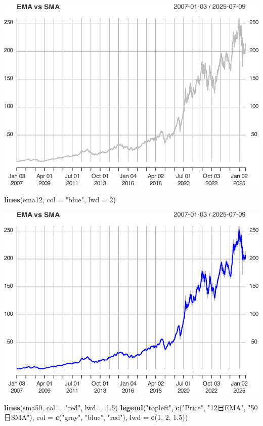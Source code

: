 \documentclass[]{ctexbook}
\newenvironment{Shaded}{\begin{snugshade}}{\end{snugshade}}
\newcommand{\AttributeTok}[1]{\textcolor[rgb]{0.13,0.29,0.53}{#1}}
\newcommand{\DecValTok}[1]{\textcolor[rgb]{0.00,0.00,0.81}{#1}}
\newcommand{\FloatTok}[1]{\textcolor[rgb]{0.00,0.00,0.81}{#1}}
\newcommand{\FunctionTok}[1]{\textcolor[rgb]{0.13,0.29,0.53}{\textbf{#1}}}
\newcommand{\NormalTok}[1]{#1}
\newcommand{\StringTok}[1]{\textcolor[rgb]{0.31,0.60,0.02}{#1}}
\begin{document}
\includegraphics[width=0.9\linewidth]{quantmod_files/figure-latex/ema-4}

\begin{Shaded}
\begin{Highlighting}[]
\FunctionTok{lines}\NormalTok{(ema12, }\AttributeTok{col =} \StringTok{"blue"}\NormalTok{, }\AttributeTok{lwd =} \DecValTok{2}\NormalTok{)}
\end{Highlighting}
\end{Shaded}

\includegraphics[width=0.9\linewidth]{quantmod_files/figure-latex/ema-5}

\begin{Shaded}
\begin{Highlighting}[]
\FunctionTok{lines}\NormalTok{(sma50, }\AttributeTok{col =} \StringTok{"red"}\NormalTok{, }\AttributeTok{lwd =} \FloatTok{1.5}\NormalTok{)}
\FunctionTok{legend}\NormalTok{(}\StringTok{"topleft"}\NormalTok{, }\FunctionTok{c}\NormalTok{(}\StringTok{"Price"}\NormalTok{, }\StringTok{"12日EMA"}\NormalTok{, }\StringTok{"50日SMA"}\NormalTok{), }
       \AttributeTok{col =} \FunctionTok{c}\NormalTok{(}\StringTok{"gray"}\NormalTok{, }\StringTok{"blue"}\NormalTok{, }\StringTok{"red"}\NormalTok{), }\AttributeTok{lwd =} \FunctionTok{c}\NormalTok{(}\DecValTok{1}\NormalTok{, }\DecValTok{2}\NormalTok{, }\FloatTok{1.5}\NormalTok{))}
\end{Highlighting}
\end{Shaded}
\end{document}
